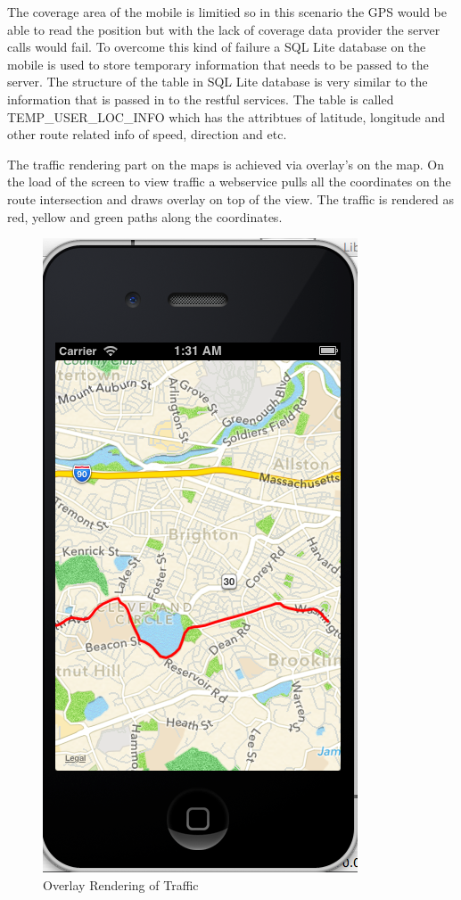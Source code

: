 \documentclass[10pt]{sigplan-proc-varsize}
\begin{document}
The coverage area of the mobile is limitied so in this scenario the GPS would be able to read the position but with the lack of coverage data provider the server calls would fail. To overcome this kind of failure a SQL Lite database on the mobile is used to store temporary information that needs to be passed to the server.  The structure of the table in SQL Lite database is very similar to the information that is passed in to the restful services. The table is called TEMP\_USER\_LOC\_INFO which has the attribtues of latitude, longitude and other route related info of speed, direction and etc.

The traffic rendering part on the maps is achieved via overlay's on the map. On the load of the screen to view traffic a webservice pulls all the coordinates on the route intersection and draws overlay on top of the view. The traffic is rendered as red, yellow and green paths along the coordinates.

\begin{figure}[h!]
  \caption{Overlay Rendering of Traffic}
  \centering
    \includegraphics[scale=0.4]{traffic}
\end{figure}
\end{document}
